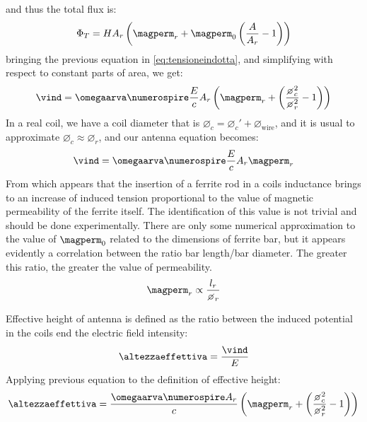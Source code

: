 and thus the total flux is:
\begin{equation}
\Phi_T = H A_r \braces{ \magperm_r + \magperm_0 \braces{ \dfrac{A}{A_r} - 1} }
\end{equation}
bringing the previous equation in \ref{eq:tensioneindotta}, and simplifying with respect to constant parts of area, we get:
\begin{equation}
\vind = \omegaarva \numerospire \dfrac{E}{c} A_r \braces{\magperm_r + \braces{\dfrac{\diameter_c^2}{\diameter_r^2}-1}}
\end{equation}
In a real coil, we have a coil diameter that is ${\diameter_c = \diameter_c' + \diameter_\mathrm{wire}}$, and it is usual to approximate ${\diameter_c \approx \diameter_r}$, and our antenna equation becomes:
\begin{equation}
\vind = \omegaarva \numerospire \dfrac{E}{c} A_r \magperm_r
\end{equation}
From which appears that the insertion of a ferrite rod in a coils inductance brings to an increase of induced tension proportional to the value of magnetic permeability of the ferrite itself. The identification of this value is not trivial and should be done experimentally. There are only some numerical approximation to the value of $\magperm_0$ related to the dimensions of ferrite bar, but it appears evidently a correlation between the ratio bar length/bar diameter. The greater this ratio, the greater the value of permeability. 
\begin{equation}
\magperm_r \propto \dfrac{l_r}{\diameter_r}
\end{equation}

Effective height of antenna is defined as the ratio between the induced potential in the coils end the electric field intensity:
\begin{equation}
\altezzaeffettiva = \dfrac{\vind}{E}
\end{equation}
Applying previous equation to the definition of effective height:
\begin{equation}
\altezzaeffettiva = \dfrac{\omegaarva \numerospire A_r}{c} \braces{\magperm_r + \braces{\dfrac{\diameter_c^2}{\diameter_r^2}-1}}
\end{equation}

